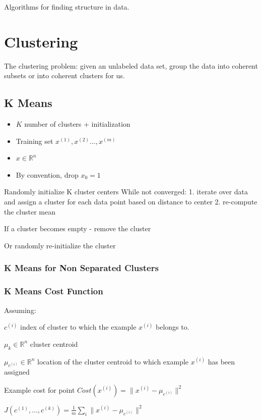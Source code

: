 Algorithms for finding structure in data.

\section{Clustering}

The clustering problem: given an unlabeled data set, group the data into coherent  subsets or into coherent clusters for us.

\subsection{K Means}

\begin{itemize}
\item $K$ number of clusters + initialization
\item Training set ${x^{(1)},x^{(2)}\dots,x^{(m)}}$
\item $x\in\mathbb{R}^n$
\item By convention, drop $x_0=1$
\end{itemize}

Randomly initialize K cluster centers
While not converged:
1. iterate over data and assign a cluster for each data point based on distance to center
2. re-compute the cluster mean

If a cluster becomes empty - remove the cluster

Or randomly re-initialize the cluster

\subsubsection{K Means for Non Separated Clusters}

\subsubsection{K Means Cost Function}

Assuming: 

$c^{(i)}$ index of cluster to which the example $x^{(i)}$ belongs to.

$\mu_k \in \mathbb R ^n $ cluster centroid 

$\mu_{c^{(i)}} \in \mathbb R ^n $ location of the cluster centroid to which example $x^{(i)}$ has been assigned

Example cost for point $Cost(x^{(i)}) = \|x^{(i)} - \mu_{c^{(i)}} \|^2$ 

$J(c^{(1)},\dots, c^{(k)})= \frac{1}{m}\sum_i \|x^{(i)} - \mu_{c^{(i)}} \|^2 $

